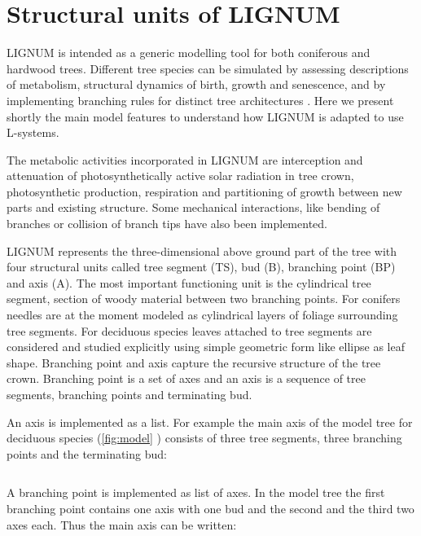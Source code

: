 \section{Structural units of LIGNUM}
LIGNUM is intended as a generic modelling tool for both coniferous and
hardwood trees.  Different tree  species can be simulated by assessing
descriptions of  metabolism, structural dynamics of  birth, growth and
senescence,  and by  implementing  branching rules  for distinct  tree
architectures  \citep{perttunen:96,  perttunen:01}.   Here we  present
shortly the main model features to understand how LIGNUM is adapted to
use L-systems.

The metabolic  activities incorporated in LIGNUM  are interception and
attenuation  of  photosynthetically  active  solar radiation  in  tree
crown,  photosynthetic  production,  respiration and  partitioning  of
growth  between  new parts  and  existing  structure. Some  mechanical
interactions,  like bending of  branches or  collision of  branch tips
have also been implemented.

LIGNUM represents the three-dimensional  above ground part of the tree
with  four  structural  units  called  tree  segment  (TS),  bud  (B),
branching point (BP) and axis (A). The most important functioning unit
is the cylindrical tree segment, section of woody material between two
branching points.  For  conifers needles are at the  moment modeled as
cylindrical  layers   of  foliage  surrounding   tree  segments.   For
deciduous species leaves attached  to tree segments are considered and
studied explicitly  using simple geometric  form like ellipse  as leaf
shape.  Branching  point and axis  capture the recursive  structure of
the tree  crown.  Branching point is  a set of  axes and an axis  is a
sequence of tree segments, branching points and terminating bud.

An axis  is implemented as  a list. For  example the main axis  of the
model tree for deciduous  species (\ref{fig:model} ) consists of three
tree segments, three branching points and the terminating bud:

\begin{equation}
[TS_0,BP_1,TS_2,BP_3,TS_4,BP_5,B_6]
\end{equation}

A branching point is implemented as list  of axes. In the model tree the
first branching  point contains one axis  with one bud  and the second
and the third two axes each. Thus the main axis can be written:

